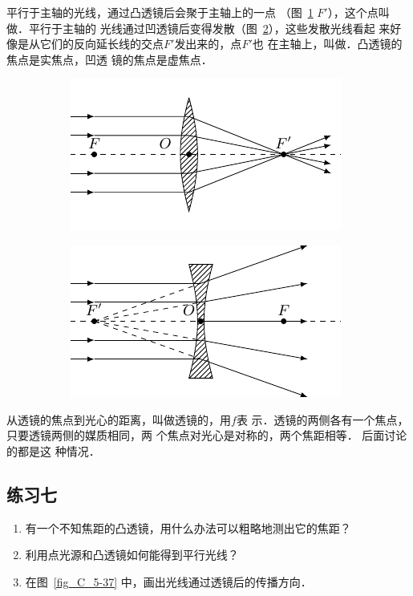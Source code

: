 平行于主轴的光线，通过凸透镜后会聚于主轴上的一点
（图~\ref{fig_C_5-36a} $F'$），这个点叫做．平行于主轴的
光线通过凹透镜后变得发散（图~\ref{fig_C_5-36b}），这些发散光线看起
来好像是从它们的反向延长线的交点$F'$发出来的，点$F'$也
在主轴上，叫做．凸透镜的焦点是实焦点，凹透
镜的焦点是虚焦点．
\begin{figure}[htbp]
    \centering
    \begin{subfigure}{0.4\linewidth}
        \centering
        \includegraphics{fig/C/5-36a.pdf}
        \caption{}\label{fig_C_5-36a}
    \end{subfigure}
    \hfil
    \begin{subfigure}{0.4\linewidth}
        \centering
        \includegraphics{fig/C/5-36b.pdf}
        \caption{}\label{fig_C_5-36b}
    \end{subfigure}
    \caption{}\label{fig_C_5-36}
\end{figure}

从透镜的焦点到光心的距离，叫做透镜的，用$f$表
示．透镜的两侧各有一个焦点，只要透镜两侧的媒质相同，两
个焦点对光心是对称的，两个焦距相等．
后面讨论的都是这
种情况．

\subsection*{练习七}
\begin{enumerate}
    \item 有一个不知焦距的凸透镜，用什么办法可以粗略地测出它的焦距？
    \item 利用点光源和凸透镜如何能得到平行光线？
    \item 在图~\ref{fig_C_5-37} 中，画出光线通过透镜后的传播方向．
\end{enumerate}

